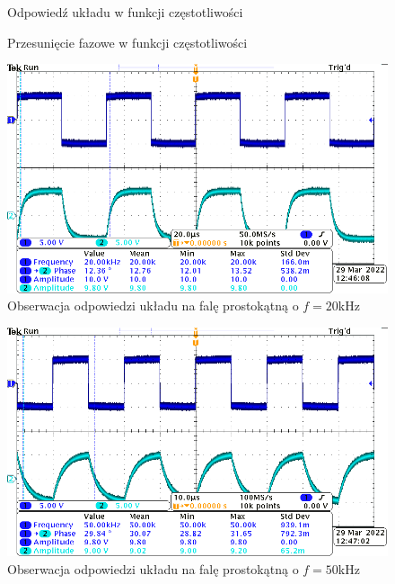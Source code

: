 
\begin{figure}[H]
	\centering
	
	\caption{Odpowiedź układu w funkcji częstotliwości}
\end{figure}

\begin{figure}[H]
	\centering
	
	\caption{Przesunięcie fazowe w funkcji częstotliwości}
\end{figure}

\begin{figure}[H]
	\centering
	\includegraphics[width=\textwidth]{include/3/20k.png}
	\caption{Obserwacja odpowiedzi układu na falę prostokątną o \(f=20\)kHz}
\end{figure}

\begin{figure}[H]
	\centering
	\includegraphics[width=\textwidth]{include/3/50k.png}
	\caption{Obserwacja odpowiedzi układu na falę prostokątną o \(f=50\)kHz}
\end{figure}
